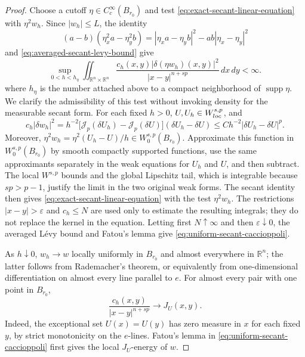 \documentclass[10pt,a4paper]{amsart}
\newcommand{\Jp}{\mathcal J_p}
\newcommand{\R}{\mathbb R}
\newcommand{\dd}{\,d}
\begin{document}
\begin{proof}
Choose a cutoff \(\eta\in C_c^\infty(B_{r_0})\) and test
\eqref{eq:exact-secant-linear-equation} with $\eta^2w_h$.  Since
\(|w_h|\le L\), the identity
\[
 (a-b)(\eta_x^2a-\eta_y^2b)
 =|\eta_xa-\eta_yb|^2-ab|\eta_x-\eta_y|^2
\]
and \eqref{eq:averaged-secant-levy-bound} give
\begin{equation}
 \sup_{0<h<h_\eta}
 \iint_{\R^n\times\R^n}
 \frac{c_h(x,y)|\delta(\eta w_h)(x,y)|^2}
 {|x-y|^{n+sp}}\dd x\!\dd y<\infty.
 \label{eq:uniform-secant-caccioppoli}
\end{equation}
where \(h_\eta\) is the number attached above to a compact
neighborhood of \(\operatorname{supp}\eta\).  We clarify the
admissibility of this test without invoking density for the measurable
secant form.  For each fixed \(h>0\),
\(U,U_h\in W^{s,p}_{\rm loc}\), and
\[
 c_h|\delta w_h|^2
 =h^{-2}\bigl[\Jp(\delta U_h)-\Jp(\delta U)\bigr]
             (\delta U_h-\delta U)
 \le Ch^{-2}|\delta U_h-\delta U|^p.
\]
Moreover, \(\eta^2w_h=\eta^2(U_h-U)/h\in W^{s,p}_0(B_{r_0})\).
Approximate this function in \(W^{s,p}_0(B_{r_0})\) by smooth compactly
supported functions, use the same approximants separately in the weak
equations for \(U_h\) and \(U\), and then subtract.  The local
\(W^{s,p}\) bounds and the global Lipschitz tail, which is integrable
because \(sp>p-1\), justify the limit in the two original weak forms.
The secant identity then gives
\eqref{eq:exact-secant-linear-equation} with the test
\(\eta^2w_h\).  The restrictions
\(|x-y|>\varepsilon\) and \(c_h\le N\) are used only to estimate the
resulting integrals; they do not replace the kernel in the equation.
Letting first \(N\uparrow\infty\) and then
\(\varepsilon\downarrow0\), the averaged L\'evy bound and Fatou's
lemma give \eqref{eq:uniform-secant-caccioppoli}.

As $h\downarrow0$, $w_h\to w$ locally uniformly in $B_{r_0}$ and almost
everywhere in $\R^n$; the latter follows from Rademacher's theorem, or
equivalently from one-dimensional differentiation on almost every line
parallel to \(e\).  For almost every pair with one point in
$B_{r_0}$,
\[
 \frac{c_h(x,y)}{|x-y|^{n+sp}}\longrightarrow J_U(x,y).
\]
Indeed, the exceptional set \(U(x)=U(y)\) has zero measure in \(x\)
for each fixed \(y\), by strict monotonicity on the \(e\)-lines.
Fatou's lemma in \eqref{eq:uniform-secant-caccioppoli} first gives the
local \(J_U\)-energy of \(w\).


\end{proof}
\end{document}
